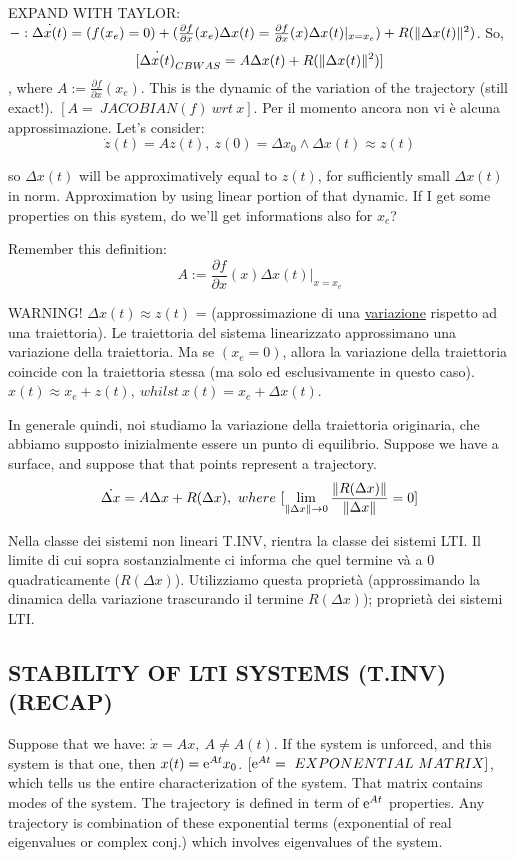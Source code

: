 EXPAND WITH TAYLOR: $ -: \dot{\Delta x(t)} = (f(x_e) = 0) + (\frac{\partial{f}}{\partial{x}}(x_e)\Delta x(t) = \frac{\partial{f}}{\partial{x}}(x)\Delta x(t)|_{x=x_e}) + R(\lVert\Delta x(t)\rVert^2)$.
So,
\[
	[\dot{\Delta x(t)}_{CBWAS} = A\Delta x(t) + R(\lVert\Delta x(t)\rVert^2)]
\]
, where $A := \frac{\partial{f}}{\partial{x}}(x_e)$. This is the dynamic of the variation of the trajectory (still exact!). $[A =\ JACOBIAN(f)\ wrt\ x]$. Per il momento ancora non vi è alcuna approssimazione. Let's consider:
\[
	\dot{z}(t) = Az(t),\ z(0) =\Delta x_0 \land \Delta x(t) \approx z(t)
\]

so $\Delta x(t)$ will be approximatively equal to $z(t)$, for sufficiently small $\Delta x(t)$ in norm. Approximation by using linear portion of that dynamic. If I get some properties on this system, do we'll get informations also for $x_e$?

Remember this definition:
\[
	A := \frac{\partial{f}}{\partial{x}}(x)\Delta x(t)|_{x=x_e}
\]

WARNING! $\Delta x(t) \approx z(t)$ = (approssimazione di una \underline{variazione} rispetto ad una traiettoria). Le traiettoria del sistema linearizzato approssimano una variazione della traiettoria. Ma se $(x_e=0)$, allora la variazione della traiettoria coincide con la traiettoria stessa (ma solo ed esclusivamente in questo caso). $x(t) \approx x_e + z(t),\ whilst\ x(t) = x_e + \Delta x(t)$.

In generale quindi, noi studiamo la variazione della traiettoria originaria, che abbiamo supposto inizialmente essere un punto di equilibrio. Suppose we have a surface, and suppose that that points represent a trajectory.
\[
	\dot{\Delta x} = A\Delta x + R(\Delta x),\ where\ [\lim_{\lVert\Delta x\rVert\to 0}{\frac{\lVert R(\Delta x)\rVert}{\lVert\Delta x\rVert}} = 0]
\]

Nella classe dei sistemi non lineari T.INV, rientra la classe dei sistemi LTI. Il limite di cui sopra sostanzialmente ci informa che quel termine và a 0 quadraticamente ($R(\Delta x)$). Utilizziamo questa proprietà (approssimando la dinamica della variazione trascurando il termine $R(\Delta x)$); proprietà dei sistemi LTI.

\subsection{STABILITY OF LTI SYSTEMS (T.INV) (RECAP)}

Suppose that we have: $\dot{x}=Ax,\ A \neq A(t)$. If the system is unforced, and this system is that one, then $x(t) = \mathop{}\!\mathrm{e}^{At}x_0$. $[\mathop{}\!\mathrm{e}^{At} =\ EXPONENTIAL\ MATRIX]$, which tells us the entire characterization of the system. That matrix contains modes of the system. The trajectory is defined in term of $\mathop{}\!\mathrm{e}^{At}$ properties. Any trajectory is combination of these exponential terms (exponential of real eigenvalues or complex conj.) which involves eigenvalues of the system.

